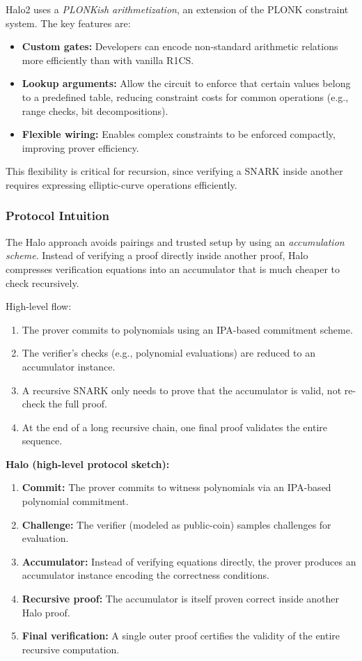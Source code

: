 Halo2 uses a \emph{PLONKish arithmetization}, an extension of the PLONK constraint system. 
The key features are:
\begin{itemize}
    \item \textbf{Custom gates:} Developers can encode non-standard arithmetic relations more efficiently than with vanilla R1CS.
    \item \textbf{Lookup arguments:} Allow the circuit to enforce that certain values belong to a predefined table, reducing constraint costs for common operations (e.g., range checks, bit decompositions).
    \item \textbf{Flexible wiring:} Enables complex constraints to be enforced compactly, improving prover efficiency.
\end{itemize}
This flexibility is critical for recursion, since verifying a SNARK inside another requires expressing elliptic-curve operations efficiently.

\subsubsection*{Protocol Intuition}

The Halo approach avoids pairings and trusted setup by using an \emph{accumulation scheme}. 
Instead of verifying a proof directly inside another proof, Halo compresses verification equations into an accumulator that is much cheaper to check recursively.

High-level flow:
\begin{enumerate}
    \item The prover commits to polynomials using an IPA-based commitment scheme.
    \item The verifier’s checks (e.g., polynomial evaluations) are reduced to an accumulator instance.
    \item A recursive SNARK only needs to prove that the accumulator is valid, not re-check the full proof.
    \item At the end of a long recursive chain, one final proof validates the entire sequence.
\end{enumerate}

\begin{protocol}
\textbf{Halo (high-level protocol sketch):}
\begin{enumerate}
    \item \textbf{Commit:} The prover commits to witness polynomials via an IPA-based polynomial commitment.
    \item \textbf{Challenge:} The verifier (modeled as public-coin) samples challenges for evaluation.
    \item \textbf{Accumulator:} Instead of verifying equations directly, the prover produces an accumulator instance encoding the correctness conditions.
    \item \textbf{Recursive proof:} The accumulator is itself proven correct inside another Halo proof.
    \item \textbf{Final verification:} A single outer proof certifies the validity of the entire recursive computation.
\end{enumerate}
\end{protocol}

